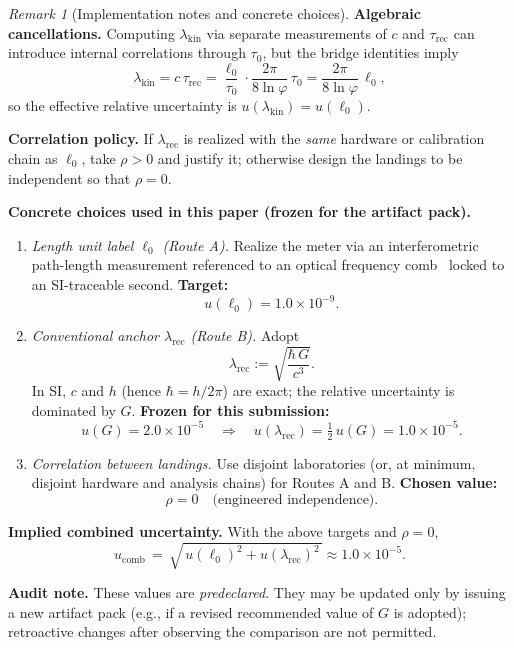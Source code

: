 \documentclass[11pt]{article}
\theoremstyle{plain}
\theoremstyle{definition}
\theoremstyle{remark}
\newtheorem*{remark}{Remark}
\begin{document}
\begin{remark}[Implementation notes and concrete choices]
\textbf{Algebraic cancellations.} Computing \(\lambda_{\mathrm{kin}}\) via separate measurements of \(c\) and \(\tau_{\mathrm{rec}}\) can introduce internal correlations through \(\tau_{0}\), but the bridge identities imply
\[
\lambda_{\mathrm{kin}}=c\,\tau_{\mathrm{rec}}=\frac{\ell_{0}}{\tau_{0}}\cdot\frac{2\pi}{8\ln\varphi}\,\tau_{0}=\frac{2\pi}{8\ln\varphi}\,\ell_{0},
\]
so the effective relative uncertainty is \(u(\lambda_{\mathrm{kin}})=u(\ell_{0})\).

\textbf{Correlation policy.} If \(\lambda_{\mathrm{rec}}\) is realized with the \emph{same} hardware or calibration chain as \(\ell_{0}\), take \(\rho>0\) and justify it; otherwise design the landings to be independent so that \(\rho=0\).

\medskip
\noindent\textbf{Concrete choices used in this paper (frozen for the artifact pack).}
\begin{enumerate}
  \item \emph{Length unit label \(\ell_{0}\) (Route A).} Realize the meter via an interferometric path-length measurement referenced to an optical frequency comb~\cite{Udem2002,Ludlow2015} locked to an SI-traceable second. \textbf{Target:}
  \[
  u(\ell_{0})=1.0\times10^{-9}.
  \]
  \item \emph{Conventional anchor \(\lambda_{\mathrm{rec}}\) (Route B).} Adopt
  \[
  \lambda_{\mathrm{rec}}:=\sqrt{\frac{\hbar\,G}{c^{3}}}.
  \]
  In SI, \(c\) and \(h\) (hence \(\hbar=h/2\pi\)) are exact; the relative uncertainty is dominated by \(G\). \textbf{Frozen for this submission:}
  \[
  u(G)=2.0\times10^{-5}\quad\Longrightarrow\quad u(\lambda_{\mathrm{rec}})=\tfrac12\,u(G)=1.0\times10^{-5}.
  \]
  \item \emph{Correlation between landings.} Use disjoint laboratories (or, at minimum, disjoint hardware and analysis chains) for Routes A and B. \textbf{Chosen value:}
  \[
  \rho=0\quad\text{(engineered independence)}.
  \]
\end{enumerate}

\textbf{Implied combined uncertainty.} With the above targets and \(\rho=0\),
\[
u_{\mathrm{comb}}\,=\,\sqrt{\,u(\ell_{0})^{2}+u(\lambda_{\mathrm{rec}})^{2}\,}\approx 1.0\times10^{-5}.
\]

\textbf{Audit note.} These values are \emph{pre\-declared}. They may be updated only by issuing a new artifact pack (e.g., if a revised recommended value of \(G\) is adopted); retroactive changes after observing the comparison are not permitted.
\end{remark}
\end{document}
